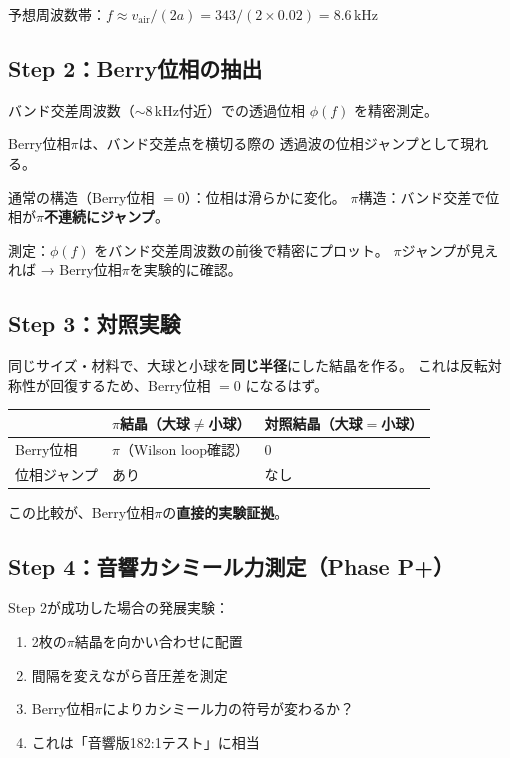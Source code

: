 \documentclass[11pt,a4paper]{article}
\begin{document}
予想周波数帯：$f \approx v_{\mathrm{air}} / (2a) = 343/(2 \times 0.02) = 8.6$\,kHz

\subsection{Step 2：Berry位相の抽出}

バンド交差周波数（$\sim 8$\,kHz付近）での透過位相 $\phi(f)$ を精密測定。

\begin{tcolorbox}[colback=yellow!5,colframe=yellow!60!black,title=Berry位相の測定原理]
Berry位相$\pi$は、バンド交差点を横切る際の
透過波の位相ジャンプとして現れる。

通常の構造（Berry位相 $= 0$）：位相は滑らかに変化。
$\pi$構造：バンド交差で位相が$\pi$\textbf{不連続にジャンプ}。

測定：$\phi(f)$ をバンド交差周波数の前後で精密にプロット。
$\pi$ジャンプが見えれば → Berry位相$\pi$を実験的に確認。
\end{tcolorbox}

\subsection{Step 3：対照実験}

同じサイズ・材料で、大球と小球を\textbf{同じ半径}にした結晶を作る。
これは反転対称性が回復するため、Berry位相 $= 0$ になるはず。

\begin{center}
\begin{tabular}{lll}
\toprule
& $\pi$結晶（大球$\neq$小球） & 対照結晶（大球$=$小球） \\
\midrule
Berry位相 & $\pi$（Wilson loop確認） & $0$ \\
位相ジャンプ & あり & なし \\
\bottomrule
\end{tabular}
\end{center}

この比較が、Berry位相$\pi$の\textbf{直接的実験証拠}。

\subsection{Step 4：音響カシミール力測定（Phase P+）}

Step 2が成功した場合の発展実験：

\begin{enumerate}
\item 2枚の$\pi$結晶を向かい合わせに配置
\item 間隔を変えながら音圧差を測定
\item Berry位相$\pi$によりカシミール力の符号が変わるか？
\item これは「音響版182:1テスト」に相当
\end{enumerate}
\end{document}
